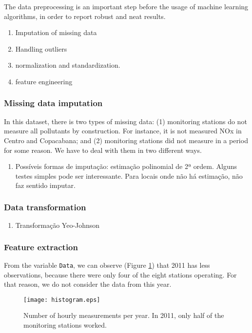 The data preprocessing is an important step before the usage of machine
learning algorithms, in order to report robust and neat results. 

\begin{enumerate}
    \item Imputation of missing data
    \item Handling outliers
    \item normalization and standardization. 
    \item feature engineering
\end{enumerate}

\subsubsection{Missing data imputation}

In this dataset, there is two types of missing data: (1) monitoring stations
do not measure all pollutants by construction. For instance, it is not
measured NOx in Centro and Copacabana; and (2) monitoring stations did not
measure in a period for some reason. We have to deal with them in two
different ways. 

\begin{enumerate}
    \item Possíveis formas de imputação: estimação polinomial de 2ª ordem.
    Alguns testes simples pode ser interessante. Para locais onde não há
    estimação, não faz sentido imputar. 
\end{enumerate}

\subsubsection{Data transformation}

\begin{enumerate}
    \item Transformação Yeo-Johnson 
\end{enumerate}

\subsubsection{Feature extraction}

From the variable {\tt Data}, we can observe (Figure
\ref{fig:histogram-obs-years}) that 2011 has less observations, because there
were only four of the eight stations operating. For that reason, we do not
consider the data from this year. 

\begin{figure}
    \begin{center}
        \texttt{[image: histogram.eps]}
    \end{center}
    \caption{Number of hourly measurements per year. In 2011, only half of the monitoring stations worked.}
    \label{fig:histogram-obs-years}
\end{figure}

